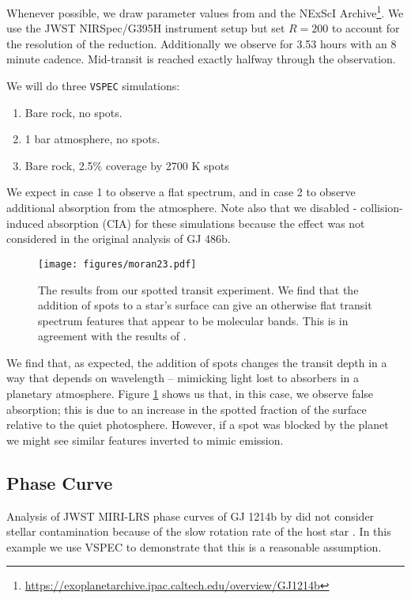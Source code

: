 \documentclass[twocolumn]{aastex631}
\begin{document}
Whenever possible, we draw parameter values from \citet{moran2023} and the NExScI Archive\footnote{\url{https://exoplanetarchive.ipac.caltech.edu/overview/GJ1214b}}.
We use the JWST NIRSpec/G395H instrument setup but set $R=200$ to account for the resolution of the reduction.
Additionally we observe for 3.53 hours with an 8 minute cadence. Mid-transit is reached exactly halfway through the observation.

We will do three \texttt{VSPEC} simulations:
\begin{enumerate}
    \item Bare rock, no spots.
    \item 1 bar  atmosphere, no spots.
    \item Bare rock, 2.5\% coverage by 2700 K spots
\end{enumerate}

We expect in case 1 to observe a flat spectrum, and in case 2 to observe additional
absorption from the  atmosphere. Note also that we disabled - collision-induced absorption (CIA) for
these simulations because the effect was not considered in the original analysis of GJ 486b.

\begin{figure}
    \centering
    \texttt{[image: figures/moran23.pdf]}
    \caption{
        The results from our spotted transit experiment. We find that the addition of
        spots to a star's surface can give an otherwise flat transit spectrum features that appear to be molecular bands.
        This is in agreement with the results of \citet{moran2023}.
        }
    \label{fig:moran_transit}
\end{figure}

We find that, as expected, the addition of spots changes the transit depth in a way that depends on wavelength -- mimicking
light lost to absorbers in a planetary atmosphere. Figure \ref{fig:moran_transit} shows us that, in this case, we observe false absorption;
this is due to an increase in the spotted fraction of the surface relative to the quiet photosphere. However, if a spot was blocked by
the planet we might see similar features inverted to mimic emission.

\subsection{Phase Curve}
Analysis of JWST MIRI-LRS phase curves of GJ 1214b by \citet{kempton2023} did not consider stellar
contamination because of the slow rotation rate of the host star \citep[approximately 1/80$^{\text{th}}$ the orbital frequency,][]{cloutier2021}.
In this example we use {\sc VSPEC} to demonstrate that this is a reasonable assumption.
\end{document}
